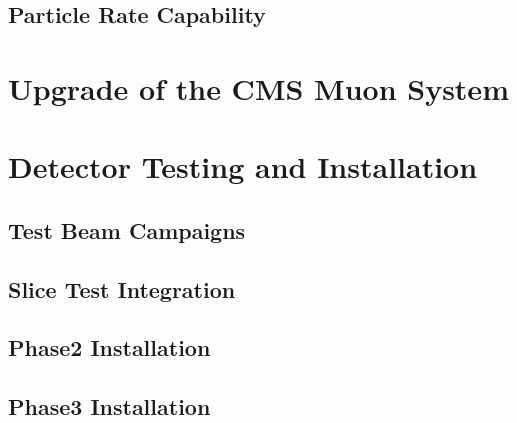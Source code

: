         \subsection{Particle Rate Capability}

    \section{Upgrade of the CMS Muon System}

    \section{Detector Testing and Installation}

        \subsection{Test Beam Campaigns}

        \subsection{Slice Test Integration}

        \subsection{Phase2 Installation}

        \subsection{Phase3 Installation}
